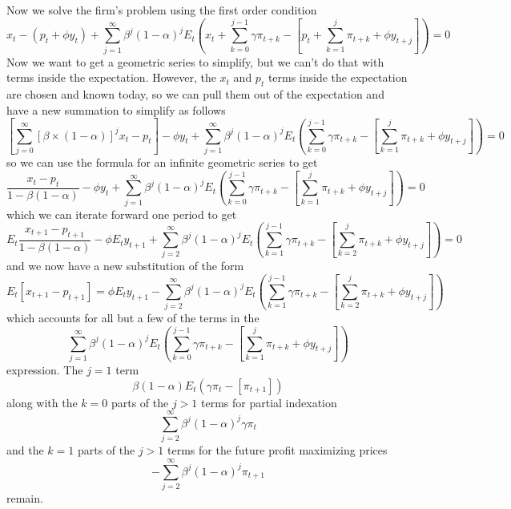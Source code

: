\documentclass[11pt]{amsart}
\begin{document}
Now we solve the firm's problem using the first order condition
\[
x_t - (p_t + \phi y_t) + \sum_{j=1}^{\infty} \beta^j (1-\alpha)^j E_t \left( x_t + \sum_{k=0}^{j-1} \gamma \pi_{t+k} - \left[ p_t + \sum_{k=1}^j \pi_{t+k} + \phi y_{t+j} \right] \right) = 0
\]
Now we want to get a geometric series to simplify, but we can't do that with terms inside the expectation. 
However, the $x_t$ and $p_t$ terms inside the expectation are chosen and known today, so we can pull them out of the expectation and have a new summation to simplify as follows
\[
\left[ \sum_{j=0}^{\infty} [\beta \times (1-\alpha)]^j x_t - p_t \right] -\phi y_t +  \sum_{j=1}^{\infty} \beta^j (1-\alpha)^j E_t \left( \sum_{k=0}^{j-1} \gamma \pi_{t+k} - \left[ \sum_{k=1}^j \pi_{t+k} + \phi y_{t+j} \right] \right) = 0
\]
so we can use the formula for an infinite geometric series to get
\[
\frac{x_t - p_t}{1 - \beta (1-\alpha)} - \phi y_t +  \sum_{j=1}^{\infty} \beta^j (1-\alpha)^j E_t \left( \sum_{k=0}^{j-1} \gamma \pi_{t+k} - \left[ \sum_{k=1}^j \pi_{t+k} + \phi y_{t+j} \right] \right) = 0
\]
which we can iterate forward one period to get
\[
E_t \frac{x_{t+1} - p_{t+1}}{1 - \beta (1-\alpha)} - \phi E_t y_{t+1} +  \sum_{j=2}^{\infty} \beta^j (1-\alpha)^j E_t \left( \sum_{k=1}^{j-1} \gamma \pi_{t+k} - \left[ \sum_{k=2}^j \pi_{t+k} + \phi y_{t+j} \right] \right) = 0
\]
and we now have a new substitution of the form
\[
E_t [x_{t+1} - p_{t+1}] = \phi E_t y_{t+1} - \sum_{j=2}^{\infty} \beta^j (1-\alpha)^j E_t \left( \sum_{k=1}^{j-1} \gamma \pi_{t+k} - \left[ \sum_{k=2}^j \pi_{t+k} + \phi y_{t+j} \right] \right)
\]
which accounts for all but a few of the terms in the 
\[
\sum_{j=1}^{\infty} \beta^j (1-\alpha)^j E_t \left( \sum_{k=0}^{j-1} \gamma \pi_{t+k} - \left[ \sum_{k=1}^j \pi_{t+k} + \phi y_{t+j} \right] \right)
\]
expression.
The $j=1$ term
\[
\beta (1-\alpha) E_t \left( \gamma \pi_{t} - \left[ \pi_{t+1} \right] \right)
\]
along with the $k=0$ parts of the $j>1$ terms for partial indexation
\[
\sum_{j=2}^{\infty}\beta^j (1-\alpha)^j \gamma \pi_t 
\]
and the $k=1$ parts of the $j>1$ terms for the future profit maximizing prices
\[
- \sum_{j=2}^{\infty} \beta^j (1-\alpha)^j \pi_{t+1}
\]
remain.
\end{document}
